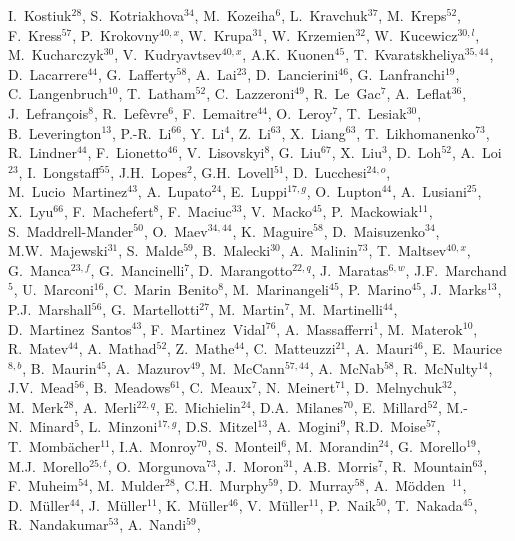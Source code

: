 \begin{flushleft}
I.~Kostiuk$^{28}$,
S.~Kotriakhova$^{34}$,
M.~Kozeiha$^{6}$,
L.~Kravchuk$^{37}$,
M.~Kreps$^{52}$,
F.~Kress$^{57}$,
P.~Krokovny$^{40,x}$,
W.~Krupa$^{31}$,
W.~Krzemien$^{32}$,
W.~Kucewicz$^{30,l}$,
M.~Kucharczyk$^{30}$,
V.~Kudryavtsev$^{40,x}$,
A.K.~Kuonen$^{45}$,
T.~Kvaratskheliya$^{35,44}$,
D.~Lacarrere$^{44}$,
G.~Lafferty$^{58}$,
A.~Lai$^{23}$,
D.~Lancierini$^{46}$,
G.~Lanfranchi$^{19}$,
C.~Langenbruch$^{10}$,
T.~Latham$^{52}$,
C.~Lazzeroni$^{49}$,
R.~Le~Gac$^{7}$,
A.~Leflat$^{36}$,
J.~Lefran{\c{c}}ois$^{8}$,
R.~Lef{\`e}vre$^{6}$,
F.~Lemaitre$^{44}$,
O.~Leroy$^{7}$,
T.~Lesiak$^{30}$,
B.~Leverington$^{13}$,
P.-R.~Li$^{66}$,
Y.~Li$^{4}$,
Z.~Li$^{63}$,
X.~Liang$^{63}$,
T.~Likhomanenko$^{73}$,
R.~Lindner$^{44}$,
F.~Lionetto$^{46}$,
V.~Lisovskyi$^{8}$,
G.~Liu$^{67}$,
X.~Liu$^{3}$,
D.~Loh$^{52}$,
A.~Loi$^{23}$,
I.~Longstaff$^{55}$,
J.H.~Lopes$^{2}$,
G.H.~Lovell$^{51}$,
D.~Lucchesi$^{24,o}$,
M.~Lucio~Martinez$^{43}$,
A.~Lupato$^{24}$,
E.~Luppi$^{17,g}$,
O.~Lupton$^{44}$,
A.~Lusiani$^{25}$,
X.~Lyu$^{66}$,
F.~Machefert$^{8}$,
F.~Maciuc$^{33}$,
V.~Macko$^{45}$,
P.~Mackowiak$^{11}$,
S.~Maddrell-Mander$^{50}$,
O.~Maev$^{34,44}$,
K.~Maguire$^{58}$,
D.~Maisuzenko$^{34}$,
M.W.~Majewski$^{31}$,
S.~Malde$^{59}$,
B.~Malecki$^{30}$,
A.~Malinin$^{73}$,
T.~Maltsev$^{40,x}$,
G.~Manca$^{23,f}$,
G.~Mancinelli$^{7}$,
D.~Marangotto$^{22,q}$,
J.~Maratas$^{6,w}$,
J.F.~Marchand$^{5}$,
U.~Marconi$^{16}$,
C.~Marin~Benito$^{8}$,
M.~Marinangeli$^{45}$,
P.~Marino$^{45}$,
J.~Marks$^{13}$,
P.J.~Marshall$^{56}$,
G.~Martellotti$^{27}$,
M.~Martin$^{7}$,
M.~Martinelli$^{44}$,
D.~Martinez~Santos$^{43}$,
F.~Martinez~Vidal$^{76}$,
A.~Massafferri$^{1}$,
M.~Materok$^{10}$,
R.~Matev$^{44}$,
A.~Mathad$^{52}$,
Z.~Mathe$^{44}$,
C.~Matteuzzi$^{21}$,
A.~Mauri$^{46}$,
E.~Maurice$^{8,b}$,
B.~Maurin$^{45}$,
A.~Mazurov$^{49}$,
M.~McCann$^{57,44}$,
A.~McNab$^{58}$,
R.~McNulty$^{14}$,
J.V.~Mead$^{56}$,
B.~Meadows$^{61}$,
C.~Meaux$^{7}$,
N.~Meinert$^{71}$,
D.~Melnychuk$^{32}$,
M.~Merk$^{28}$,
A.~Merli$^{22,q}$,
E.~Michielin$^{24}$,
D.A.~Milanes$^{70}$,
E.~Millard$^{52}$,
M.-N.~Minard$^{5}$,
L.~Minzoni$^{17,g}$,
D.S.~Mitzel$^{13}$,
A.~Mogini$^{9}$,
R.D.~Moise$^{57}$,
T.~Momb{\"a}cher$^{11}$,
I.A.~Monroy$^{70}$,
S.~Monteil$^{6}$,
M.~Morandin$^{24}$,
G.~Morello$^{19}$,
M.J.~Morello$^{25,t}$,
O.~Morgunova$^{73}$,
J.~Moron$^{31}$,
A.B.~Morris$^{7}$,
R.~Mountain$^{63}$,
F.~Muheim$^{54}$,
M.~Mulder$^{28}$,
C.H.~Murphy$^{59}$,
D.~Murray$^{58}$,
A.~M{\"o}dden~$^{11}$,
D.~M{\"u}ller$^{44}$,
J.~M{\"u}ller$^{11}$,
K.~M{\"u}ller$^{46}$,
V.~M{\"u}ller$^{11}$,
P.~Naik$^{50}$,
T.~Nakada$^{45}$,
R.~Nandakumar$^{53}$,
A.~Nandi$^{59}$,

\end{flushleft}
